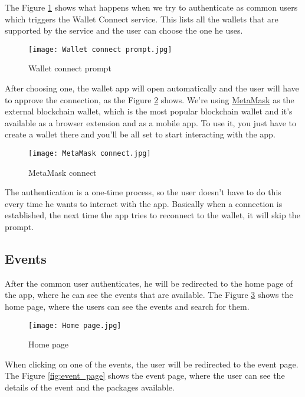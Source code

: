 The Figure \ref{fig:wallet_connect_prompt} shows what happens when we try to
authenticate as common users which triggers the Wallet Connect service. This
lists all the wallets that are supported by the service and the user can choose
the one he uses.

\begin{figure}[H]
	\texttt{[image: Wallet connect prompt.jpg]}
	\centering
	\caption{Wallet connect prompt}
	\label{fig:wallet_connect_prompt}
\end{figure}

After choosing one, the wallet app will open automatically and the user will
have to approve the connection, as the Figure \ref{fig:metamask_connect} shows.
We're using \href{https://metamask.io/}{MetaMask} as the external blockchain
wallet, which is the most popular blockchain wallet and it's available as a
browser extension and as a mobile app. To use it, you just have to create a
wallet there and you'll be all set to start interacting with the app.

\begin{figure}[H]
	\texttt{[image: MetaMask connect.jpg]}
	\centering
	\caption{MetaMask connect}
	\label{fig:metamask_connect}
\end{figure}

The authentication is a one-time process, so the user doesn't have to do this
every time he wants to interact with the app. Basically when a connection is
established, the next time the app tries to reconnect to the wallet, it will
skip the prompt.

\subsection{Events}
\label{subsec:events}

After the common user authenticates, he will be redirected to the home page of
the app, where he can see the events that are available. The Figure
\ref{fig:home_page} shows the home page, where the users can see the events and
search for them.

\begin{figure}[H]
	\texttt{[image: Home page.jpg]}
	\centering
	\caption{Home page}
	\label{fig:home_page}
\end{figure}

When clicking on one of the events, the user will be redirected to the event
page. The Figure \ref{fig:event_page} shows the event page, where the user can
see the details of the event and the packages available.

